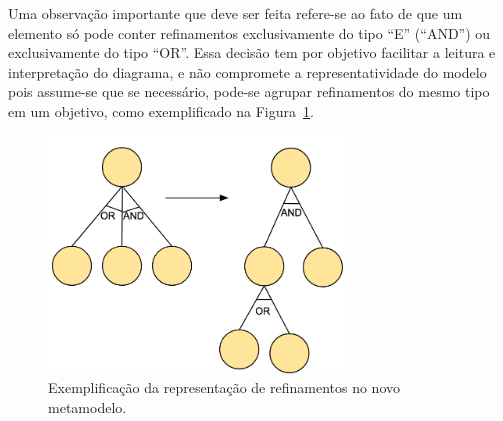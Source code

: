 Uma observação importante que deve ser feita refere-se ao fato de que um elemento só pode conter refinamentos exclusivamente do tipo ``E'' (``AND'') ou exclusivamente do tipo ``OR''. Essa decisão tem por objetivo facilitar a leitura e interpretação do diagrama, e não compromete a representatividade do modelo pois assume-se que se necessário, pode-se agrupar refinamentos do mesmo tipo em um objetivo, como exemplificado na Figura~\ref{figura-refinamentos}.

\begin{figure}[h]
	\centering
	\includegraphics[width=0.7\textwidth]{figuras/metamodelos/exemplo-or-and.png}
	\caption{Exemplificação da representação de refinamentos no novo metamodelo.}
	\label{figura-refinamentos}
\end{figure}